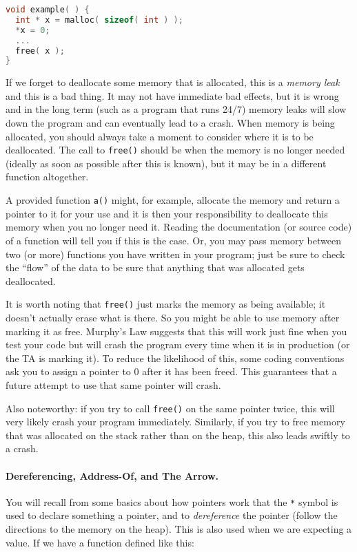 \begin{lstlisting}[language=C]
void example( ) {
  int * x = malloc( sizeof( int ) );
  *x = 0;
  ...
  free( x );
}
\end{lstlisting}

If we forget to deallocate some memory that is allocated, this is a \textit{memory leak} and this is a bad thing. It may not have immediate bad effects, but it is wrong and in the long term (such as a program that runs 24/7) memory leaks will slow down the program and can eventually lead to a crash. When memory is being allocated, you should always take a moment to consider where it is to be deallocated. The call to \texttt{free()} should be when the memory is no longer needed (ideally as soon as possible after this is known), but it may be in a different function altogether.

A provided function \texttt{a()} might, for example, allocate the memory and return a pointer to it for your use and it is then your responsibility to deallocate this memory when you no longer need it. Reading the documentation (or source code) of a function will tell you if this is the case. Or, you may pass memory between two (or more) functions you have written in your program; just be sure to check the ``flow'' of the data to be sure that anything that was allocated gets deallocated.

It is worth noting that \texttt{free()} just marks the memory as being available; it doesn't actually erase what is there. So you might be able to use memory after marking it as free. Murphy's Law suggests that this will work just fine when you test your code but will crash the program every time when it is in production (or the TA is marking it). To reduce the likelihood of this, some coding conventions ask you to assign a pointer to 0 after it has been freed. This guarantees that a future attempt to use that same pointer will crash.

Also noteworthy: if you try to call \texttt{free()} on the same pointer twice, this will very likely crash your program immediately. Similarly, if you try to free memory that was allocated on the stack rather than on the heap, this also leads swiftly to a crash.

\paragraph{Dereferencing, Address-Of, and The Arrow.}
You will recall from some basics about how pointers work that the \texttt{*} symbol is used to declare something a pointer, and to \textit{dereference} the pointer (follow the directions to the memory on the heap). This is also used when we are expecting a value. If we have a function defined like this:

